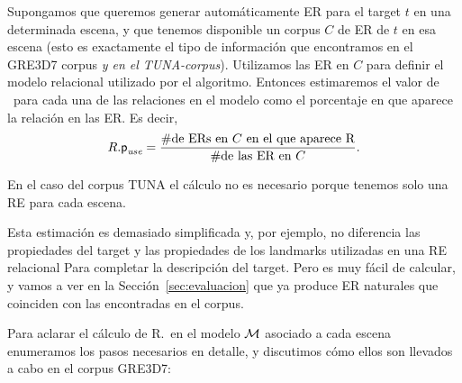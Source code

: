 Supongamos que queremos generar autom\'aticamente ER para el target $t$ en una
determinada escena, y que tenemos disponible un corpus $C$ de ER de $t$
en esa escena (esto es exactamente el tipo de informaci\'on que encontramos en el
GRE3D7 corpus \textit{y en el TUNA-corpus}). Utilizamos las ER en $C$
para definir el modelo relacional utilizado por el algoritmo. Entonces 
estimaremos el valor de \puse\ para cada una de las relaciones en el modelo como el
porcentaje en que aparece la relaci\'on en las ER. Es decir,
\begin{equation} \label{eq1}
R.\textsf{p}_\textit{use} = \frac {\#\mbox{de ERs en $C$ en el que aparece R}} {\#\mbox{de las ER en $C$}}.
\end{equation}

En el caso del corpus TUNA el c\'alculo no es necesario
porque tenemos solo una RE para cada escena.

Esta estimaci\'on es demasiado simplificada y, por ejemplo, no 
diferencia las propiedades del target y las propiedades de
los landmarks utilizadas en una RE relacional Para completar la descripci\'on
del target. Pero es muy f\'acil de calcular, y vamos a ver
en la Secci\'on~\ref{sec:evaluacion} que ya produce ER naturales
que coinciden con las encontradas en el corpus.

Para aclarar el c\'alculo de R.\puse \ en el modelo $\mathcal{M}$ asociado
a cada escena enumeramos los pasos necesarios en detalle, y discutimos c\'omo
ellos son llevados a cabo en el corpus GRE3D7:


